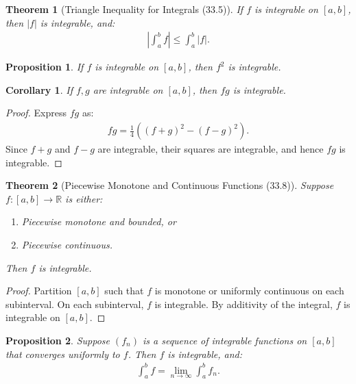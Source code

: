 \documentclass[7pt]{article}
\theoremstyle{definition}
\theoremstyle{plain}
\newtheorem{theorem}{Theorem}
\newtheorem{proposition}{Proposition}
\newtheorem{corollary}{Corollary}
\begin{document}
\begin{theorem}[Triangle Inequality for Integrals (33.5)]
If $ f $ is integrable on $ [a, b] $, then $ |f| $ is integrable, and:
\begin{align}
\left| \int_a^b f \right| \leq \int_a^b |f|.
\end{align}
\end{theorem}

\begin{proposition}
If $ f $ is integrable on $ [a, b] $, then $ f^2 $ is integrable.
\end{proposition}

\begin{corollary}
If $ f, g $ are integrable on $ [a, b] $, then $ fg $ is integrable.
\end{corollary}

\begin{proof}
Express $ fg $ as:
\begin{align}
fg = \frac{1}{4} \left( (f + g)^2 - (f - g)^2 \right).
\end{align}
Since $ f + g $ and $ f - g $ are integrable, their squares are integrable, and hence $ fg $ is integrable.
\end{proof}

\begin{theorem}[Piecewise Monotone and Continuous Functions (33.8)]
Suppose $ f : [a, b] \to \mathbb{R} $ is either:
\begin{enumerate}
    \item Piecewise monotone and bounded, or
    \item Piecewise continuous.
\end{enumerate}
Then $ f $ is integrable.
\end{theorem}

\begin{proof}
Partition $ [a, b] $ such that $ f $ is monotone or uniformly continuous on each subinterval. On each subinterval, $ f $ is integrable. By additivity of the integral, $ f $ is integrable on $ [a, b] $.
\end{proof}

\begin{proposition}
Suppose $ (f_n) $ is a sequence of integrable functions on $ [a, b] $ that converges uniformly to $ f $. Then $ f $ is integrable, and:
\begin{align}
\int_a^b f = \lim_{n \to \infty} \int_a^b f_n.
\end{align}
\end{proposition}
\end{document}

